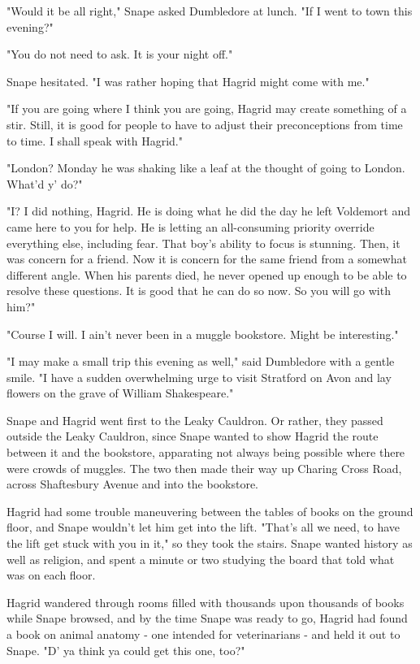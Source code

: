 "Would it be all right," Snape asked Dumbledore at lunch. "If I went to town this evening?"

"You do not need to ask. It is your night off."

Snape hesitated. "I was rather hoping that Hagrid might come with me."

"If you are going where I think you are going, Hagrid may create something of a stir. Still, it is good for people to have to adjust their preconceptions from time to time. I shall speak with Hagrid."

"London? Monday he was shaking like a leaf at the thought of going to London. What'd y' do?"

"I? I did nothing, Hagrid. He is doing what he did the day he left Voldemort and came here to you for help. He is letting an all-consuming priority override everything else, including fear. That boy's ability to focus is stunning. Then, it was concern for a friend. Now it is concern for the same friend from a somewhat different angle. When his parents died, he never opened up enough to be able to resolve these questions. It is good that he can do so now. So you will go with him?"

"Course I will. I ain't never been in a muggle bookstore. Might be interesting."

"I may make a small trip this evening as well," said Dumbledore with a gentle smile. "I have a sudden overwhelming urge to visit Stratford on Avon and lay flowers on the grave of William Shakespeare."

Snape and Hagrid went first to the Leaky Cauldron. Or rather, they passed outside the Leaky Cauldron, since Snape wanted to show Hagrid the route between it and the bookstore, apparating not always being possible where there were crowds of muggles. The two then made their way up Charing Cross Road, across Shaftesbury Avenue and into the bookstore.

Hagrid had some trouble maneuvering between the tables of books on the ground floor, and Snape wouldn't let him get into the lift. "That's all we need, to have the lift get stuck with you in it," so they took the stairs. Snape wanted history as well as religion, and spent a minute or two studying the board that told what was on each floor.

Hagrid wandered through rooms filled with thousands upon thousands of books while Snape browsed, and by the time Snape was ready to go, Hagrid had found a book on animal anatomy - one intended for veterinarians - and held it out to Snape. "D' ya think ya could get this one, too?"


